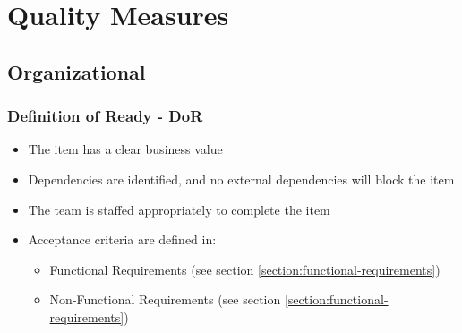 \chapter{Quality Measures}

    
    

\section{Organizational}

\subsection{Definition of Ready - DoR}

\begin{itemize}
  \item The item has a clear business value
  \item Dependencies are identified, and no external dependencies will block the item
  \item The team is staffed appropriately to complete the item
  \item Acceptance criteria are defined in:
    \begin{itemize}
      \item Functional Requirements (see section \ref{section:functional-requirements})
      \item Non-Functional Requirements (see section \ref{section:functional-requirements})
    \end{itemize}
\end{itemize}

